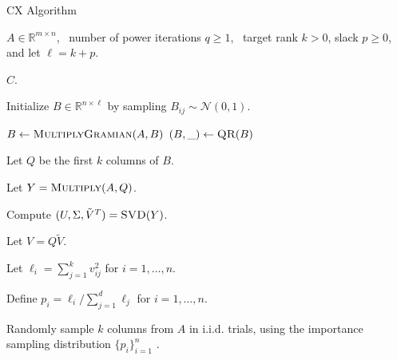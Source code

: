 \begin{algorithm}[tb]
   \caption{{\sc CX} Algorithm}
    \label{alg:cx}
    \begin{algorithmic}[1]
      \Require $A \in \mathbb{R}^{m\times n}$, \
        number of power iterations $q \ge 1$, \
        target rank $k > 0$, slack $p \ge 0$, and let $\ell=k+p$.

      \Ensure $C$.

      \State Initialize $B \in \mathbb{R}^{n\times \ell}$ by sampling $B_{ij} \sim \mathcal{N}(0, 1)$.

      \For{$q$ times}
          \State $B \gets \Call{MultiplyGramian}{A, B}$
          \State $(B, \_) \gets \Call{QR}{B}$
      \EndFor

      \State Let $Q$ be the first $k$ columns of $B$.

      \State Let $Y = \Call{Multiply}{A, Q}$.

      \State Compute $(U, \Sigma, \tilde V^T) = \Call{SVD}{Y}$.

      \State Let $V = Q \tilde V$.

	  \State Let $\ell_i = \sum_{j=1}^k v_{ij}^2$ for $i = 1, \ldots, n$.
      
      \State Define $p_i = \ell_i / \sum_{j=1}^d \ell_j$ for $i=1,\ldots,n$.
      
      \State Randomly sample $k$ columns from $A$ in i.i.d. trials, using the importance sampling distribution $\{p_i\}_{i=1}^n$ .
      \end{algorithmic}
  \end{algorithm}

